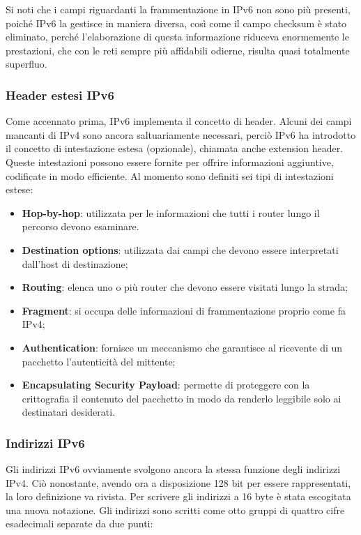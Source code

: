             Si noti che i campi riguardanti la frammentazione in IPv6 non sono più presenti, poiché IPv6
            la gestisce in maniera diversa, così come il campo checksum è stato eliminato, perché
            l’elaborazione di questa informazione riduceva enormemente le prestazioni, che con le reti
            sempre più affidabili odierne, risulta quasi totalmente superfluo.

        \subsubsection*{Header estesi IPv6}
            Come accennato prima, IPv6 implementa il concetto di header. Alcuni dei campi mancanti di
            IPv4 sono ancora saltuariamente necessari, perciò IPv6 ha introdotto il concetto di intestazione
            estesa (opzionale), chiamata anche extension header. Queste intestazioni possono essere
            fornite per offrire informazioni aggiuntive, codificate in modo efficiente. Al momento sono
            definiti sei tipi di intestazioni estese:

            \begin{itemize}
                \item \textbf{Hop-by-hop}: utilizzata per le informazioni che tutti i router lungo il percorso devono
                esaminare.
                \item \textbf{Destination options}: utilizzata dai campi che devono essere interpretati dall’host di
                destinazione;
                \item \textbf{Routing}: elenca uno o più router che devono essere visitati lungo la strada;
                \item \textbf{Fragment}: si occupa delle informazioni di frammentazione proprio come fa IPv4;
                \item \textbf{Authentication}: fornisce un meccanismo che garantisce al ricevente di un pacchetto
                l’autenticità del mittente;
                \item \textbf{Encapsulating Security Payload}: permette di proteggere con la crittografia il
                contenuto del pacchetto in modo da renderlo leggibile solo ai destinatari desiderati.
            \end{itemize}
            
        \subsubsection*{Indirizzi IPv6}
            Gli indirizzi IPv6 ovviamente svolgono ancora la stessa funzione degli indirizzi IPv4. Ciò
            nonostante, avendo ora a disposizione 128 bit per essere rappresentati, la loro definizione va
            rivista. Per scrivere gli indirizzi a 16 byte è stata escogitata una nuova notazione. Gli indirizzi
            sono scritti come otto gruppi di quattro cifre esadecimali separate da due punti:

